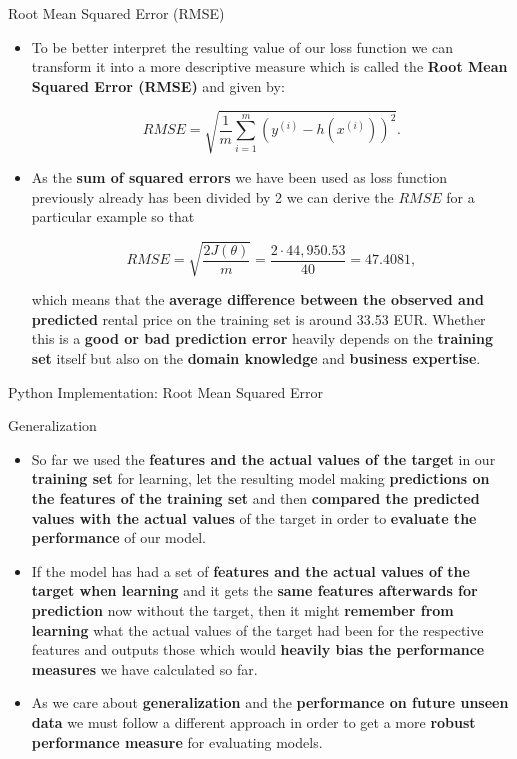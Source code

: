 \documentclass[document.tex]{subfiles}
\begin{document}
    \begin{frame}{Root Mean Squared Error (RMSE)}
        \begin{itemize}
            \item To be better interpret the resulting value of our loss function we can transform it into a more descriptive measure which is called the \textbf{Root Mean Squared Error (RMSE)} and given by:
            
            $$RMSE = \sqrt{\frac{1}{m} \sum_{i=1}^m (y^{(i)} - h(x^{(i)}))^2}.$$
            \item As the \textbf{sum of squared errors} we have been used as loss function previously already has been divided by 2 we can derive the $RMSE$ for a particular example so that 
            
            $$RMSE = \sqrt{\frac{2J(\theta)}{m}} = \frac{2 \cdot 44,950.53}{40} = 47.4081,$$
            
            which means that the \textbf{average difference between the observed and predicted} rental price on the training set is around 33.53 EUR. Whether this is a\textbf{ good or bad prediction error} heavily depends on the \textbf{training set} itself but also on the \textbf{domain knowledge} and \textbf{business expertise}. 
        \end{itemize}
    \end{frame}

    \begin{frame}{Python Implementation: Root Mean Squared Error}
        
    \end{frame}

    \begin{frame}{Generalization}
        \begin{itemize}
            \item So far we used the \textbf{features and the actual values of the target} in our \textbf{training set} for learning, let the resulting model making \textbf{predictions on the features of the training set} and then \textbf{compared the predicted values with the actual values} of the target in order to \textbf{evaluate the performance} of our model.
            \item If the model has had a set of \textbf{features and the actual values of the target when learning} and it gets the \textbf{same features afterwards for prediction} now without the target, then it might \textbf{remember from learning} what the actual values of the target had been for the respective features and outputs those which would \textbf{heavily bias the performance measures} we have calculated so far.
            \item As we care about \textbf{generalization} and the \textbf{performance on future unseen data} we must follow a different approach in order to get a more \textbf{robust performance measure} for evaluating models.
        \end{itemize}
    \end{frame}
\end{document}

